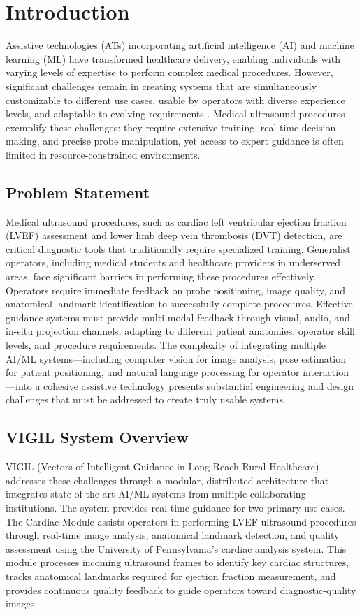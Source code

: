 \documentclass[12pt,a4paper]{article}
\begin{document}
\section{Introduction}

Assistive technologies (ATs) incorporating artificial intelligence (AI) and machine learning (ML) have transformed healthcare delivery, enabling individuals with varying levels of expertise to perform complex medical procedures. However, significant challenges remain in creating systems that are simultaneously customizable to different use cases, usable by operators with diverse experience levels, and adaptable to evolving requirements \cite{frontiers_topic}. Medical ultrasound procedures exemplify these challenges: they require extensive training, real-time decision-making, and precise probe manipulation, yet access to expert guidance is often limited in resource-constrained environments.

\subsection{Problem Statement}

Medical ultrasound procedures, such as cardiac left ventricular ejection fraction (LVEF) assessment and lower limb deep vein thrombosis (DVT) detection, are critical diagnostic tools that traditionally require specialized training. Generalist operators, including medical students and healthcare providers in underserved areas, face significant barriers in performing these procedures effectively. Operators require immediate feedback on probe positioning, image quality, and anatomical landmark identification to successfully complete procedures. Effective guidance systems must provide multi-modal feedback through visual, audio, and in-situ projection channels, adapting to different patient anatomies, operator skill levels, and procedure requirements. The complexity of integrating multiple AI/ML systems—including computer vision for image analysis, pose estimation for patient positioning, and natural language processing for operator interaction—into a cohesive assistive technology presents substantial engineering and design challenges that must be addressed to create truly usable systems.

\subsection{VIGIL System Overview}

VIGIL (Vectors of Intelligent Guidance in Long-Reach Rural Healthcare) addresses these challenges through a modular, distributed architecture that integrates state-of-the-art AI/ML systems from multiple collaborating institutions. The system provides real-time guidance for two primary use cases. The Cardiac Module assists operators in performing LVEF ultrasound procedures through real-time image analysis, anatomical landmark detection, and quality assessment using the University of Pennsylvania's cardiac analysis system. This module processes incoming ultrasound frames to identify key cardiac structures, tracks anatomical landmarks required for ejection fraction measurement, and provides continuous quality feedback to guide operators toward diagnostic-quality images.
\end{document}
